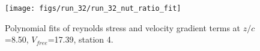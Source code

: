 \begin{figure}[H]
\centering
\texttt{[image: figs/run\_32/run\_32\_nut\_ratio\_fit]}
\caption{Polynomial fits of reynolds stress and velocity gradient terms at $z/c$=8.50, $V_{free}$=17.39, station 4.}
\label{fig:run_32_nut_ratio_fit}
\end{figure}



